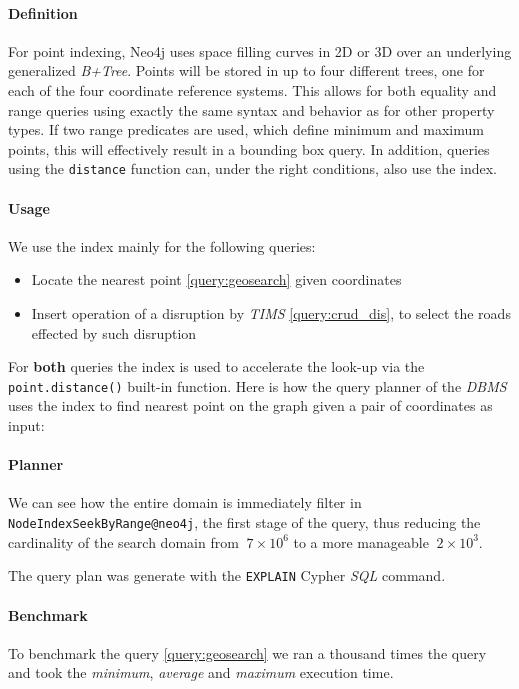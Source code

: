 \paragraph{Definition}
For point indexing, Neo4j uses space filling curves in 2D or 3D over an 
underlying generalized \textit{B+Tree}. Points will be stored in up to four 
different trees, one for each of the four coordinate reference systems. This 
allows for both equality and range queries using exactly the same syntax and 
behavior as for other property types. If two range predicates are used, which 
define minimum and maximum points, this will effectively result in a bounding 
box query. In addition, queries using the \texttt{distance} function can, under 
the right conditions, also use the index.

\paragraph{Usage}
We use the index mainly for the following queries:

\begin{itemize}
	\item Locate the nearest point \ref{query:geosearch} given coordinates
	
	\item Insert operation of a disruption by \textit{TIMS} \ref{query:crud_dis}, to select the roads effected by such disruption
\end{itemize}

For \textbf{both} queries the index is used to accelerate the look-up via the 
\texttt{point.distance()} built-in function. Here is how the query planner of 
the \textit{DBMS} uses the index to find nearest point on the graph given a 
pair of coordinates as input:

\paragraph{Planner}
We can see how the entire domain is immediately filter in 
\texttt{NodeIndexSeekByRange@neo4j}, the first stage of the query, thus 
reducing the cardinality of the 
search domain from $~7 \times 10^6$ to a more manageable $~ 2 \times 10^3$.

The query plan was generate with the \texttt{EXPLAIN} Cypher \textit{SQL 
}command.




\paragraph{Benchmark}
To benchmark the query \ref{query:geosearch} we ran a thousand times the query
and took the \textit{minimum}, \textit{average} and \textit{maximum} execution
time.

